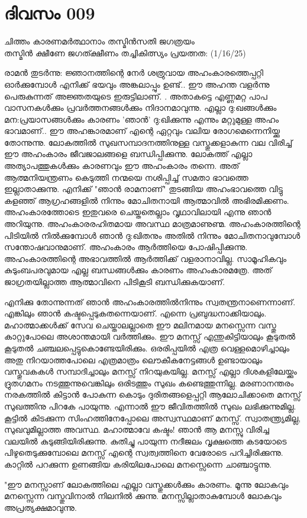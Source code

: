  
\section{ദിവസം 009}

\begin{center}
ചിത്തം കാരണമർത്ഥാനാം തസ്മിൻസതി ജഗത്രയം\\
തസ്മിൻ ക്ഷീണേ ജഗത്ക്ഷീണം തച്ചികിത്സ്യം പ്രയത്നത: (1/16/25)\\
\end{center}

രാമന്‍ തുടര്‍ന്നു: ജ്ഞാനത്തിന്റെ നേര്‍ ശത്രുവായ അഹംകാരത്തെപ്പറ്റി ഓര്‍ക്കുമ്പോള്‍ എനിക്ക്‌ ഭയവും അങ്കലാപ്പും ഉണ്ട്‌.. ഈ അഹന്ത വളര്‍ന്നു പെരുകുന്നത്‌ അജ്ഞതയുടെ ഇരുട്ടിലാണ്‌. . അതാകട്ടെ എണ്ണമറ്റ പാപ വാസനകള്‍ക്കും പ്രവര്‍ത്തനങ്ങള്‍ക്കും നിദാനമാവുന്നു. എല്ലാ ദു:ഖങ്ങള്‍ക്കും മന:പ്രയാസങ്ങള്‍ക്കും കാരണം 'ഞാന്‍' ദു:ഖിക്കുന്നു എന്നും മറ്റുമുള്ള അഹം ഭാവമാണ്‌.. ഈ അഹങ്കാരമാണ്‌ എന്റെ ഏറ്റവും വലിയ രോഗമെന്നെനിയ്ക്കു തോന്നുന്നു. ലോകത്തില്‍ സുഖസമ്പാദനത്തിനുള്ള വസ്തുക്കളാകുന്ന വല വിരിച്ച്‌ ഈ അഹംകാരം ജീവജാലങ്ങളെ ബന്ധിപ്പിക്കുന്നു. ലോകത്ത്‌ എല്ലാ അത്യാപത്തുകള്‍ക്കും കാരണവും ഈ അഹംകാരം തന്നെ. അത്‌ ആത്മനിയന്ത്രണം കെടുത്തി നന്മയെ നശിപ്പിച്ച്‌ സമതാ ഭാവത്തെ ഇല്ലാതാക്കുന്നു. എനിക്ക്‌ "ഞാന്‍ രാമനാണ്‌" തുടങ്ങിയ അഹംഭാവത്തെ വിട്ടു കളഞ്ഞ്‌ ആഗ്രഹങ്ങളില്‍ നിന്നും മോചിതനായി ആത്മാവില്‍ അഭിരമിക്കണം. 
അഹംകാരത്തോടെ ഇതുവരെ ചെയ്തതെല്ലാം വൃഥാവിലായി എന്നു ഞാന്‍ അറിയുന്നു. അഹംകാരരഹിതമായ അവസ്ഥ മാത്രമാണുണ്മ. അഹംകാരത്തിന്റെ പിടിയില്‍ നില്‍ക്കുമ്പോള്‍ ഞാന്‍ ദു:ഖിതനും അതില്‍ നിന്നും മോചിതനാവുമ്പോള്‍ സന്തോഷവാനുമാണ്‌. അഹംകാരം ആര്‍ത്തിയെ പോഷിപ്പിക്കുന്നു. അഹംകാരത്തിന്റെ അഭാവത്തില്‍ ആര്‍ത്തിക്ക്‌ വളരാനാവില്ല. സാമൂഹികവും കുടുംബപരവുമായ എല്ല ബന്ധങ്ങള്‍ക്കും കാരണം അഹംകാരമത്രേ. അത്‌ ജാഗ്രതയില്ലാത്ത ആത്മാവിനെ പിടികൂടി ബന്ധിക്കുകയാണ്‌. 


എനിക്കു തോന്നുന്നത്‌ ഞാന്‍ അഹംകാരത്തില്‍നിന്നും സ്വതന്ത്രനാണെന്നാണ്‌. എങ്കിലും ഞാന്‍ കഷ്ടപ്പെടുകതന്നെയാണ്‌. എന്നെ പ്രബുദ്ധനാക്കിയാലും. മഹാത്മാക്കള്‍ക്ക്‌ സേവ ചെയ്താലല്ലാതെ ഈ മലിനമായ മനസ്സെന്ന വസ്തു കാറ്റുപോലെ അശാന്തമായി വര്‍ത്തിക്കും. ഈ മനസ്സ്‌ എന്തുകിട്ടിയാലും കൂടുതല്‍ കൂടുതല്‍ ചഞ്ചലപ്പെട്ടുകൊണ്ടേയിരിക്കും. ഒരരിപ്പയില്‍ എത്ര വെള്ളമൊഴിച്ചാലും അതു നിറയാത്തപോലെ എത്രമാത്രം ലൌകീകനേട്ടങ്ങള്‍ ഉണ്ടായാലും വസ്തുവകകള്‍ സമ്പാദിച്ചാലും മനസ്സ്‌ നിറയുകയില്ല. മനസ്സ്‌ എല്ലാ ദിശകളിലേയ്ക്കും ദ്രുതഗമനം നടത്തുന്നുവെങ്കിലും ഒരിടത്തും സുഖം കണ്ടെത്തുന്നില്ല. മരണാനന്തരം നരകത്തില്‍ കിട്ടാന്‍ പോകുന്ന കൊടും ദുരിതങ്ങളെപ്പറ്റി ആലോചിക്കാതെ മനസ്സ്‌ സുഖത്തിനു പിറകേ പായുന്നു. എന്നാല്‍ ഈ ജീവിതത്തില്‍ സുഖം ലഭിക്കുന്നുമില്ല. കൂട്ടില്‍ കിടക്കുന്ന സിംഹത്തിനേപ്പോലെ അസ്വസ്ഥമാണ്‌ മനസ്സ്‌. സ്വാതന്ത്ര്യമില്ല, സുഖവുമില്ലാത്ത അവസ്ഥ. മഹാത്മാവേ കഷ്ടം! ഞാന്‍ ആ മനസ്സു വിരിച്ച വലയില്‍ കുടുങ്ങിയിരിക്കുന്നു. കുതിച്ചു പായുന്ന നദീജലം വൃക്ഷത്തെ കടയോടെ പിഴുതെടുക്കുമ്പോലെ മനസ്സ്‌ എന്റെ സ്വത്വത്തിനെ വേരോടെ പറിച്ചിരിക്കുന്നു. കാറ്റില്‍ പറക്കുന്ന ഉണങ്ങിയ കരിയിലപോലെ മനസ്സെന്നെ ചാഞ്ചാട്ടുന്നു.

"ഈ മനസ്സാണ്‌ ലോകത്തിലെ എല്ലാ വസ്തുക്കള്‍ക്കും കാരണം. മൂന്നു ലോകവും മനസ്സെന്ന വസ്തുവിനാല്‍ നിലനില്‍ ക്കുന്നു. മനസ്സില്ലാതാകുമ്പോള്‍ ലോകവും അപ്രത്യക്ഷമാവുന്നു.
